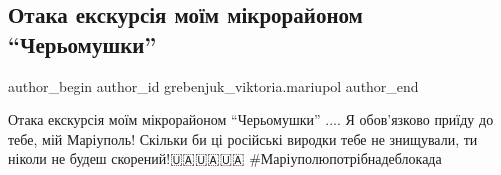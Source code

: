  
 
 
 
 

\subsection{Отака екскурсія моїм мікрорайоном \enquote{Черьомушки}}
\label{sec:17_04_2022.fb.grebenjuk_viktoria.mariupol.1.otaka_yekskurs_ya_mo}

\ifcmt
 author_begin
   author_id grebenjuk_viktoria.mariupol
 author_end
\fi

Отака екскурсія моїм мікрорайоном \enquote{Черьомушки} .... Я обов'язково приїду до тебе,
мій Маріуполь! Скільки би ці російські виродки тебе не знищували, ти ніколи не
будеш скорений!🇺🇦🇺🇦🇺🇦 \#Маріуполюпотрібнадеблокада


